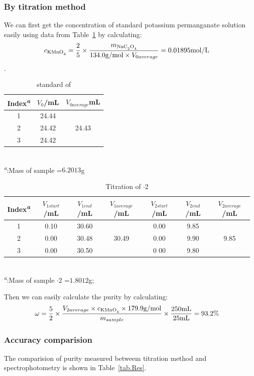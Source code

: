 \subsubsection{By titration method}

We can first get the concentration of standard potassium permanganate solution easily using data from Table~\ref{tab.CalMn} by calculating: \[c_{\ce{KMnO4}}=\frac{2}{5}\times\frac{m_{\ce{NaC2O4}}}{134.0{\rm g/mol}\times V_{0average}}=0.01895{\rm mol/L}\].

\begin{table}[H]
	\caption{standard of }
	\label{tab.CalMn}
	\begin{tabular}{ccc}
	\toprule
	Index\textsuperscript{\emph{a}}&$V_0$/mL&$V_{0average}$mL\\
	\midrule
	1    & 24.44 &\\
	2    & 24.42 & 24.43\\
	3    & 24.42 &\\
	\bottomrule
	\end{tabular}\\
	\textsuperscript{\emph{a}}:Mass of sample =$6.2013$g
\end{table}

\begin{table}[H]
	\caption{Titration of $\cdot$2}
	\label{tab.Tit}
	\begin{tabular}{ccccccc}
	\toprule
	Index\textsuperscript{\emph{a}}&$V_{1start}$/mL&$V_{1end}$/mL&$V_{1average}$/mL&$V_{2start}$/mL& $V_{2end}$/mL&$V_{2average}$/mL\\
	\midrule
	1    & 0.10 & 30.60 &       & 0.00 & 9.85 &     \\
	2    & 0.00 & 30.48 & 30.49 & 0.00 & 9.90 & 9.85\\
	3    & 0.00 & 30.50 &       & 0 00 & 9.80 &     \\
	\bottomrule
	\end{tabular}\\
	\textsuperscript{\emph{a}}:Mass of sample $\cdot$2 =$1.8012$g;
\end{table}

Then we can easily calculate the purity by calculating: \[\omega=\frac{5}{2}\times\frac{V_{2average}\times c_{\ce{KMnO4}}\times179.9{\rm g/mol}}{m_{sample}}\times\frac{250{\rm mL}}{25{\rm mL}}=93.2\%\]


\subsubsection{Accuracy comparision}
The comparision of purity measured betweem titration method and spectrophotometry is shown in Table~\ref{tab.Res}.

